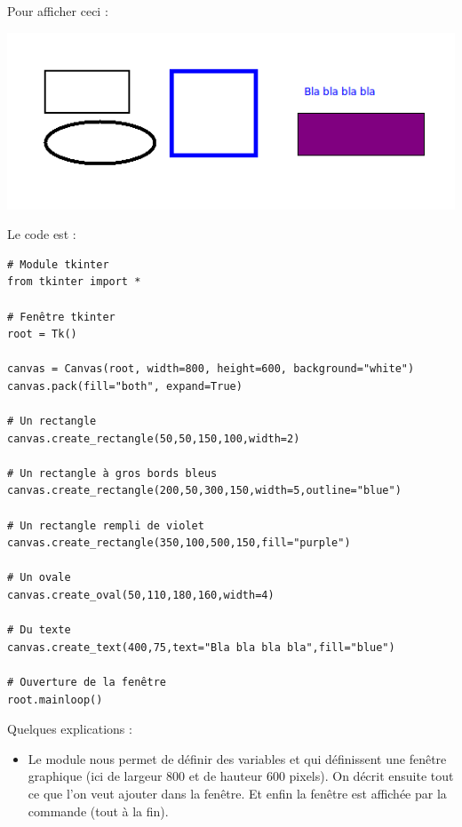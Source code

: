 \documentclass[11pt,class=report,crop=false]{standalone}
\begin{document}

\begin{cours}


Pour afficher ceci :
\begin{center}
\includegraphics[scale=\myscale,scale=0.6]{ecran-stat-cours-intro}
\end{center}
Le code est :
\begin{lstlisting}
# Module tkinter
from tkinter import *

# Fenêtre tkinter
root = Tk()
        
canvas = Canvas(root, width=800, height=600, background="white")
canvas.pack(fill="both", expand=True)

# Un rectangle
canvas.create_rectangle(50,50,150,100,width=2)

# Un rectangle à gros bords bleus
canvas.create_rectangle(200,50,300,150,width=5,outline="blue")

# Un rectangle rempli de violet
canvas.create_rectangle(350,100,500,150,fill="purple")

# Un ovale
canvas.create_oval(50,110,180,160,width=4)

# Du texte
canvas.create_text(400,75,text="Bla bla bla bla",fill="blue")

# Ouverture de la fenêtre
root.mainloop()
\end{lstlisting}


Quelques explications :
\begin{itemize}
  \item Le module  nous permet de définir des variables  et  qui définissent une fenêtre graphique (ici de largeur $800$ et de hauteur $600$ pixels).
  On décrit ensuite tout ce que l'on veut ajouter dans la fenêtre. Et enfin la fenêtre est affichée par la commande  (tout à la fin). 
  

\end{itemize}
\end{cours}
\end{document}
